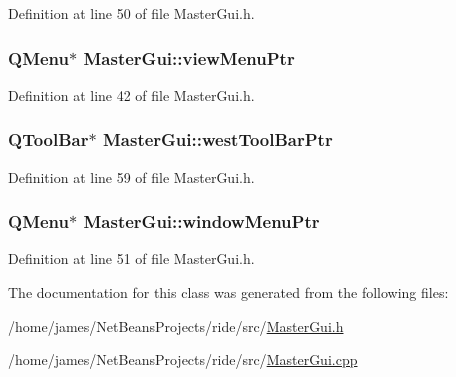 Definition at line 50 of file Master\-Gui.\-h.

\hypertarget{class_master_gui_acb6a42ddb59a05f60ab7aa2a9fdddbc8}{
\subsubsection[{view\-Menu\-Ptr}]{\setlength{\rightskip}{0pt plus 5cm}Q\-Menu$\ast$ Master\-Gui\-::view\-Menu\-Ptr\hspace{0.3cm}{\ttfamily [private]}}}\label{class_master_gui_acb6a42ddb59a05f60ab7aa2a9fdddbc8}


Definition at line 42 of file Master\-Gui.\-h.

\hypertarget{class_master_gui_ad8bf561c56063077e97f9a993fa38ee4}{
\subsubsection[{west\-Tool\-Bar\-Ptr}]{\setlength{\rightskip}{0pt plus 5cm}Q\-Tool\-Bar$\ast$ Master\-Gui\-::west\-Tool\-Bar\-Ptr\hspace{0.3cm}{\ttfamily [private]}}}\label{class_master_gui_ad8bf561c56063077e97f9a993fa38ee4}


Definition at line 59 of file Master\-Gui.\-h.

\hypertarget{class_master_gui_ae33b742ac5529096317c8096984ffef1}{
\subsubsection[{window\-Menu\-Ptr}]{\setlength{\rightskip}{0pt plus 5cm}Q\-Menu$\ast$ Master\-Gui\-::window\-Menu\-Ptr\hspace{0.3cm}{\ttfamily [private]}}}\label{class_master_gui_ae33b742ac5529096317c8096984ffef1}


Definition at line 51 of file Master\-Gui.\-h.



The documentation for this class was generated from the following files\-:\begin{DoxyCompactItemize}
\item 
/home/james/\-Net\-Beans\-Projects/ride/src/\hyperlink{_master_gui_8h}{Master\-Gui.\-h}\item 
/home/james/\-Net\-Beans\-Projects/ride/src/\hyperlink{_master_gui_8cpp}{Master\-Gui.\-cpp}\end{DoxyCompactItemize}
